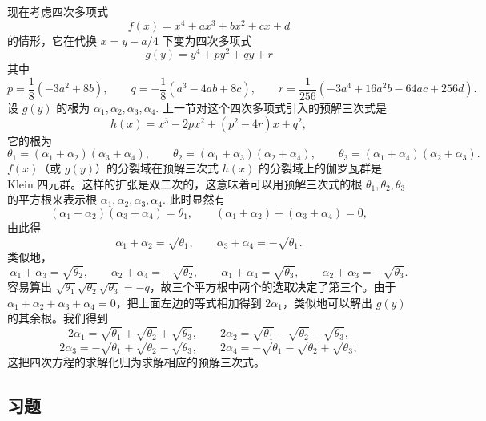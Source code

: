 现在考虑四次多项式
\[
f(x) = x^4+ax^3+bx^2+cx+d
\]
的情形，它在代换 \(x = y-a/4\) 下变为四次多项式
\[
g(y) = y^4+py^2+qy+r
\]
其中
\[
p = \frac{1}{8}(-3a^2+8b), \qquad q = -\frac{1}{8}(a^3-4ab+8c), \qquad r = \frac{1}{256}(-3a^4+16a^2b-64ac+256d).
\]
设 \(g(y)\) 的根为 \(\alpha_1, \alpha_2, \alpha_3, \alpha_4\). 上一节对这个四次多项式引入的预解三次式是
\[
h(x) = x^3-2px^2+(p^2-4r)x+q^2,
\]
它的根为
\[
\theta_1 = (\alpha_1+\alpha_2)(\alpha_3+\alpha_4), \qquad \theta_2 = (\alpha_1+\alpha_3)(\alpha_2+\alpha_4), \qquad \theta_3 = (\alpha_1+\alpha_4)(\alpha_2+\alpha_3).
\]
\(f(x)\)（或 \(g(y)\)）的分裂域在预解三次式 \(h(x)\) 的分裂域上的伽罗瓦群是 Klein 四元群。这样的扩张是双二次的，这意味着可以用预解三次式的根 \(\theta_1, \theta_2, \theta_3\) 的平方根来表示根 \(\alpha_1, \alpha_2, \alpha_3, \alpha_4\). 此时显然有
\[
(\alpha_1+\alpha_2)(\alpha_3+\alpha_4) = \theta_1, \qquad (\alpha_1+\alpha_2)+(\alpha_3+\alpha_4) = 0,
\]
由此得
\[
\alpha_1+\alpha_2 = \sqrt{\theta_1}, \qquad \alpha_3+\alpha_4 = -\sqrt{\theta_1}.
\]
类似地，
\[
\alpha_1+\alpha_3 = \sqrt{\theta_2}, \qquad \alpha_2+\alpha_4 = -\sqrt{\theta_2}, \qquad \alpha_1+\alpha_4 = \sqrt{\theta_3}, \qquad \alpha_2+\alpha_3 = -\sqrt{\theta_3}.
\]
容易算出 \(\sqrt{\theta_1}\sqrt{\theta_2}\sqrt{\theta_3} = -q\)，故三个平方根中两个的选取决定了第三个。由于 \(\alpha_1+\alpha_2+\alpha_3+\alpha_4 = 0\)，把上面左边的等式相加得到 \(2\alpha_1\)，类似地可以解出 \(g(y)\) 的其余根。我们得到
\[
2\alpha_1 = \sqrt{\theta_1}+\sqrt{\theta_2}+\sqrt{\theta_3}, \qquad 2\alpha_2 = \sqrt{\theta_1}-\sqrt{\theta_2}-\sqrt{\theta_3},
\]
\[
2\alpha_3 = -\sqrt{\theta_1}+\sqrt{\theta_2}-\sqrt{\theta_3}, \qquad 2\alpha_4 = -\sqrt{\theta_1}-\sqrt{\theta_2}+\sqrt{\theta_3},
\]
这把四次方程的求解化归为求解相应的预解三次式。

\subsection*{习题}

